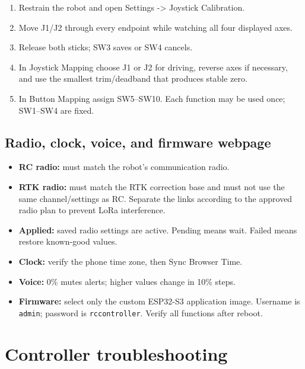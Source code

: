 \documentclass[
  10pt,
  letterpaper,
  openany]{report}
\providecommand{\tightlist}{%
  \setlength{\itemsep}{0pt}\setlength{\parskip}{0pt}}
\begin{document}
\begin{enumerate}
\tightlist
\item
  Restrain the robot and open Settings -\textgreater{} Joystick
  Calibration.
\item
  Move J1/J2 through every endpoint while watching all four displayed
  axes.
\item
  Release both sticks; SW3 saves or SW4 cancels.
\item
  In Joystick Mapping choose J1 or J2 for driving, reverse axes if
  necessary, and use the smallest trim/deadband that produces stable
  zero.
\item
  In Button Mapping assign SW5--SW10. Each function may be used once;
  SW1--SW4 are fixed.
\end{enumerate}

\subsection{Radio, clock, voice, and firmware
webpage}\label{radio-clock-voice-and-firmware-webpage}

\begin{itemize}
\tightlist
\item
  \textbf{RC radio:} must match the robot's communication radio.
\item
  \textbf{RTK radio:} must match the RTK correction base and must not
  use the same channel/settings as RC. Separate the links according to
  the approved radio plan to prevent LoRa interference.
\item
  \textbf{Applied:} saved radio settings are active. Pending means wait.
  Failed means restore known-good values.
\item
  \textbf{Clock:} verify the phone time zone, then Sync Browser Time.
\item
  \textbf{Voice:} 0\% mutes alerts; higher values change in 10\% steps.
\item
  \textbf{Firmware:} select only the custom ESP32-S3 application image.
  Username is \texttt{admin}; password is \texttt{rccontroller}. Verify
  all functions after reboot.
\end{itemize}

\protect{}\label{controller-trouble}
\section{Controller troubleshooting}\label{controller-troubleshooting}
\end{document}

